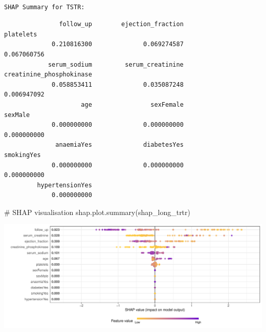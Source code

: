 \documentclass[
  letterpaper,
  DIV=11,
  numbers=noendperiod]{scrartcl}
\newenvironment{Shaded}{\begin{snugshade}}{\end{snugshade}}
\newcommand{\CommentTok}[1]{\textcolor[rgb]{0.37,0.37,0.37}{#1}}
\newcommand{\FunctionTok}[1]{\textcolor[rgb]{0.28,0.35,0.67}{#1}}
\newcommand{\NormalTok}[1]{\textcolor[rgb]{0.00,0.23,0.31}{#1}}
\newcommand{\SpecialCharTok}[1]{\textcolor[rgb]{0.37,0.37,0.37}{#1}}
\begin{document}
\begin{verbatim}

SHAP Summary for TSTR:
\end{verbatim}

\begin{Shaded}
\end{Shaded}

\begin{verbatim}
               follow_up        ejection_fraction                platelets 
             0.210816300              0.069274587              0.067060756 
            serum_sodium         serum_creatinine creatinine_phosphokinase 
             0.058853411              0.035087248              0.006947092 
                     age                sexFemale                  sexMale 
             0.000000000              0.000000000              0.000000000 
              anaemiaYes              diabetesYes               smokingYes 
             0.000000000              0.000000000              0.000000000 
         hypertensionYes 
             0.000000000 
\end{verbatim}

\begin{Shaded}
\begin{Highlighting}[]
\CommentTok{\# SHAP visualisation}
\FunctionTok{shap.plot.summary}\NormalTok{(shap\_long\_trtr)}
\end{Highlighting}
\end{Shaded}

\begin{center}
\includegraphics[width=1\linewidth,height=\textheight,keepaspectratio]{heart_failure_synthetic_data_project_files/figure-pdf/Feature Importance Consistency Assessment-2.pdf}
\end{center}
\end{document}
